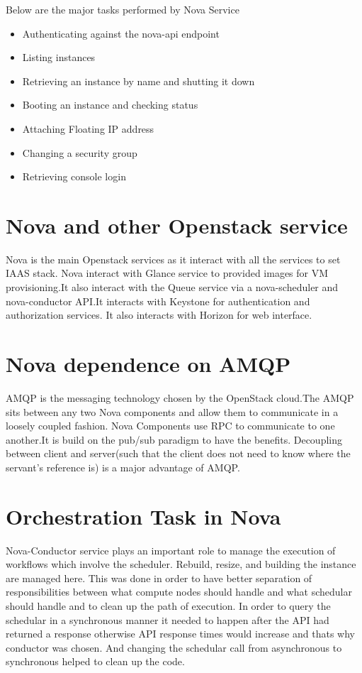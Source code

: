 \documentclass[9pt,twocolumn,twoside]{../../styles/osajnl}
\begin{document}
Below are the major tasks performed by Nova Service\cite{www-nova-ibm}
\begin{itemize}

\item Authenticating against the nova-api endpoint

\item Listing instances

\item Retrieving an instance by name and shutting it down

\item Booting an instance and checking status

\item Attaching Floating IP address

\item Changing a security group 

\item Retrieving console login

\end{itemize}

\section{Nova and other Openstack service}

Nova is the main Openstack services as it interact with all the services to set IAAS stack.
Nova interact with Glance service to provided images for VM provisioning.It also interact with the Queue service via a nova-scheduler and nova-conductor API.It interacts with Keystone for authentication and authorization services. It also interacts with Horizon for web interface.

\section{Nova dependence on AMQP}
AMQP is the messaging technology chosen by the OpenStack cloud.The AMQP sits between any two Nova components and allow them to communicate in a loosely coupled fashion. Nova Components use RPC to communicate to one another.It is build on the pub/sub paradigm to have the benefits. Decoupling between client and server(such that the client does not need to know where the servant's reference is) is a major advantage of AMQP\cite{www-nova-amqp}.

\section{Orchestration Task in Nova}
Nova-Conductor service plays an important role to manage the execution of workflows which involve the scheduler. Rebuild, resize, and building the instance are managed here. This was done in order to have better separation of responsibilities between what compute nodes should handle and what schedular should handle and to clean up the path of execution. In order to query the schedular in a synchronous manner it needed to happen after the API had returned a response otherwise API response times would increase and thats why conductor was chosen. And changing the schedular call from asynchronous to synchronous helped to clean up the code\cite{www-nova-orchestrator}.
\end{document}
